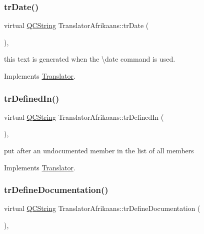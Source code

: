 \mbox{\label{class_translator_afrikaans_ac2f278bb6543c95187c5b0a3f0fd3465}} 
\subsubsection{\texorpdfstring{trDate()}{trDate()}}
{\footnotesize\ttfamily virtual \mbox{\hyperlink{class_q_c_string}{Q\+C\+String}} Translator\+Afrikaans\+::tr\+Date (\begin{DoxyParamCaption}{ }\end{DoxyParamCaption})\hspace{0.3cm}{\ttfamily [inline]}, {\ttfamily [virtual]}}

this text is generated when the \textbackslash{}date command is used. 

Implements \mbox{\hyperlink{class_translator}{Translator}}.

\mbox{\label{class_translator_afrikaans_a2d92c2a62318363a02aeafbdd4e104d6}} 
\subsubsection{\texorpdfstring{trDefinedIn()}{trDefinedIn()}}
{\footnotesize\ttfamily virtual \mbox{\hyperlink{class_q_c_string}{Q\+C\+String}} Translator\+Afrikaans\+::tr\+Defined\+In (\begin{DoxyParamCaption}{ }\end{DoxyParamCaption})\hspace{0.3cm}{\ttfamily [inline]}, {\ttfamily [virtual]}}

put after an undocumented member in the list of all members 

Implements \mbox{\hyperlink{class_translator}{Translator}}.

\mbox{\label{class_translator_afrikaans_aa214f7767fa74ae6ff1b019bae8672ea}} 
\subsubsection{\texorpdfstring{trDefineDocumentation()}{trDefineDocumentation()}}
{\footnotesize\ttfamily virtual \mbox{\hyperlink{class_q_c_string}{Q\+C\+String}} Translator\+Afrikaans\+::tr\+Define\+Documentation (\begin{DoxyParamCaption}{ }\end{DoxyParamCaption})\hspace{0.3cm}{\ttfamily [inline]}, {\ttfamily [virtual]}}

